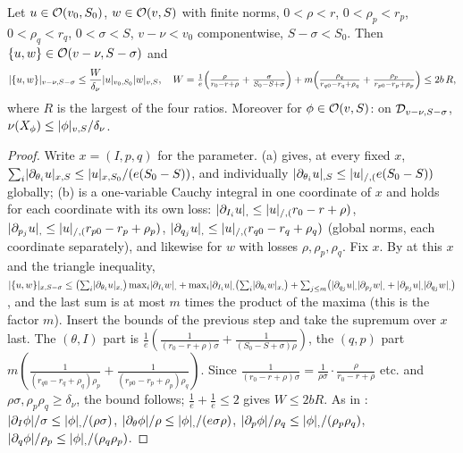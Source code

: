 \begin{lemma}\label{bpP:p2:osc-bracket}
Let $u\in\mathcal O(v_0,S_0)$, $w\in\mathcal O(v,S)$ with finite norms, $0<\rho<r$, $0<\rho_p<r_p$, $0<\rho_q<r_q$, $0<\sigma<S$, $v-\nu<v_0$ componentwise, $S-\sigma<S_0$. Then $\{u,w\}\in\mathcal O(v-\nu,S-\sigma)$ and
\[\lvert \{u,w\}\rvert_{v-\nu,S-\sigma}\le\frac{W}{\delta_\nu}\lvert u\rvert_{v_0,S_0}\lvert w\rvert_{v,S},\quad W=\tfrac1e\Bigl(\tfrac{\rho}{r_0-r+\rho}+\tfrac{\sigma}{S_0-S+\sigma}\Bigr)+m\Bigl(\tfrac{\rho_q}{r_{q0}-r_q+\rho_q}+\tfrac{\rho_p}{r_{p0}-r_p+\rho_p}\Bigr)\le2b\,R,\]
where $R$ is the largest of the four ratios. Moreover for $\phi\in\mathcal O(v,S)$: on $\mathcal D_{v-\nu,S-\sigma}$, $\nu(X_\phi)\le\lvert \phi\rvert_{v,S}/\delta_\nu$.
\end{lemma}
\begin{proof}
\label{stepP:p2:ob-der} Write $x=(I,p,q)$ for the parameter. (a) gives, at every fixed $x$, $\sum_i\lvert \partial_{\theta_i}u\rvert_{x,S}\le\lvert u\rvert_{x,S_0}/(e(S_0-S))$, and individually $\lvert \partial_{\theta_i}u\rvert_{,S}\le\lvert u\rvert_{/,(}e(S_0-S))$ globally; (b) is a one-variable Cauchy integral in one coordinate of $x$ and holds for each coordinate with its own loss: $\lvert \partial_{I_i}u\rvert_{,}\le\lvert u\rvert_{/,(}r_0-r+\rho)$, $\lvert \partial_{p_j}u\rvert_{,}\le\lvert u\rvert_{/,(}r_{p0}-r_p+\rho_p)$, $\lvert \partial_{q_j}u\rvert_{,}\le\lvert u\rvert_{/,(}r_{q0}-r_q+\rho_q)$ (global norms, each coordinate separately), and likewise for $w$ with losses $\rho,\rho_p,\rho_q$.
\label{stepP:p2:ob-prod} Fix $x$. By  at this $x$ and the triangle inequality, $\lvert \{u,w\}\rvert_{x,S-\sigma}\le\bigl(\sum_i\lvert \partial_{\theta_i}u\rvert_{x,}\bigr)\max_i\lvert \partial_{I_i}w\rvert_{,}+\max_i\lvert \partial_{I_i}u\rvert_{,}\bigl(\sum_i\lvert \partial_{\theta_i}w\rvert_{x,}\bigr)+\sum_{j\le m}\bigl(\lvert \partial_{q_j}u\rvert_{,}\lvert \partial_{p_j}w\rvert_{,}+\lvert \partial_{p_j}u\rvert_{,}\lvert \partial_{q_j}w\rvert_{,}\bigr)$,
and the last sum is at most $m$ times the product of the maxima (this is the factor $m$). Insert the bounds of the previous step and take the supremum over $x$ last. The $(\theta,I)$ part is $\frac1e(\frac1{(r_0-r+\rho)\sigma}+\frac1{(S_0-S+\sigma)\rho})$, the $(q,p)$ part $m(\frac1{(r_{q0}-r_q+\rho_q)\rho_p}+\frac1{(r_{p0}-r_p+\rho_p)\rho_q})$. Since $\frac1{(r_0-r+\rho)\sigma}=\frac1{\rho\sigma}\cdot\frac\rho{r_0-r+\rho}$ etc. and $\rho\sigma,\rho_p\rho_q\ge\delta_\nu$, the bound follows; $\frac1e+\frac1e\le2$ gives $W\le2bR$.
\label{stepP:p2:ob-field} As in : $\lvert \partial_I\phi\rvert/\sigma\le\lvert \phi\rvert_{,}/(\rho\sigma)$, $\lvert \partial_\theta\phi\rvert/\rho\le\lvert \phi\rvert_{,}/(e\sigma\rho)$, $\lvert \partial_p\phi\rvert/\rho_q\le\lvert \phi\rvert_{,}/(\rho_p\rho_q)$, $\lvert \partial_q\phi\rvert/\rho_p\le\lvert \phi\rvert_{,}/(\rho_q\rho_p)$.
\end{proof}

